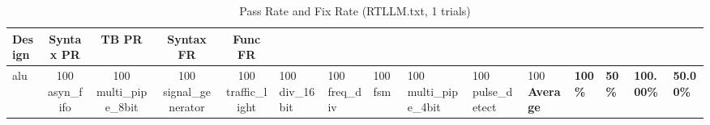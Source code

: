\begin{table}[h]
\centering
\caption{Pass Rate and Fix Rate (RTLLM.txt, 1 trials)}
\begin{tabular}{l|cc|cc}
  \hline
  Design & Syntax PR & TB PR & Syntax FR & Func FR \\
  \hline
  alu & 100%
  asyn_fifo & 100%
  multi_pipe_8bit & 100%
  signal_generator & 100%
  traffic_light & 100%
  div_16bit & 100%
  freq_div & 100%
  fsm & 100%
  multi_pipe_4bit & 100%
  pulse_detect & 100%
  \hline
  \textbf{Average} & \textbf{100\%} & \textbf{50\%} & \textbf{100.00\%} & \textbf{50.00\%} \\
  \hline
\end{tabular}
\end{table}